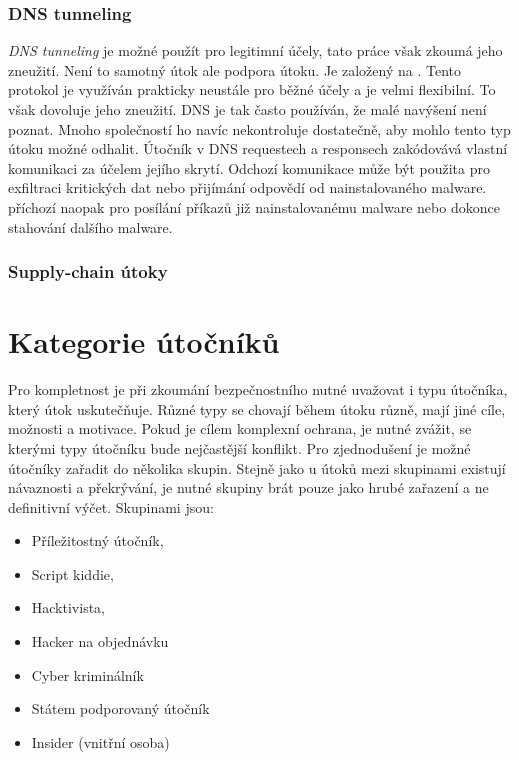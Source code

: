 \subsubsection{DNS tunneling}
\textit{DNS tunneling} je možné použít pro legitimní účely, tato práce však zkoumá jeho zneužití.
Není to samotný útok ale podpora útoku.
Je založený na .
Tento protokol je využíván prakticky neustále pro běžné účely a je velmi flexibilní.
To však dovoluje jeho zneužití.
\ac{DNS} je tak často používán, že malé navýšení není poznat.
Mnoho společností ho navíc nekontroluje dostatečně, aby mohlo tento typ útoku možné odhalit.
Útočník v \ac{DNS} requestech a responsech zakódovává vlastní komunikaci za účelem jejího skrytí.
Odchozí komunikace může být použita pro exfiltraci kritických dat nebo přijímání odpovědí od nainstalovaného malware.
příchozí naopak pro posílání příkazů již nainstalovanému malware nebo dokonce stahování dalšího malware.\cite{cisco_most_common_attack, bright_sec_dns_tunneling}

\subsubsection{Supply-chain útoky}

\section{Kategorie útočníků}
Pro kompletnost je při zkoumání bezpečnostního nutné uvažovat i typu útočníka, který útok uskutečňuje.
Různé typy se chovají během útoku různě, mají jiné cíle, možnosti a motivace.
Pokud je cílem komplexní ochrana, je nutné zvážit, se kterými typy útočníku bude nejčastější konflikt.
Pro zjednodušení je možné útočníky zařadit do několika skupin.
Stejně jako u útoků mezi skupinami existují návaznosti a překrývání, je nutné skupiny brát pouze jako hrubé zařazení a ne definitivní výčet.
Skupinami jsou:
\begin{itemize}
	\item Příležitostný útočník,
	\item Script kiddie,
	\item Hacktivista,
	\item Hacker na objednávku
	\item Cyber kriminálník
	\item Státem podporovaný útočník
	\item Insider (vnitřní osoba)
\end{itemize}\cite{Enisa_thread_landscape,data_flair_attackers}

